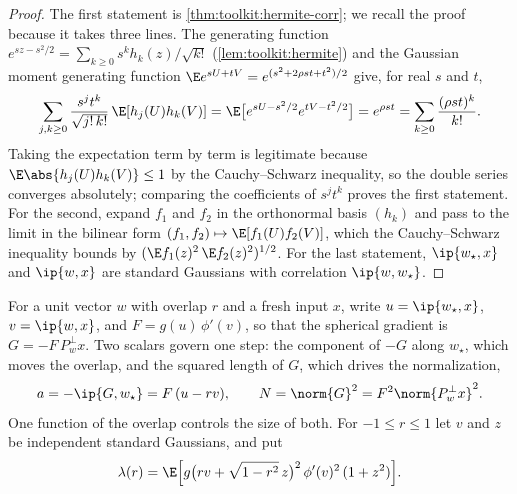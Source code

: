 \begin{refsection}
\begin{proof}
The first statement is \cref{thm:toolkit:hermite-corr}; we recall the proof because it takes three lines. The generating function $e^{sz-s^2/2}=\sum_{k\ge0}s^kh_k(z)/\sqrt{k!}$ (\cref{lem:toolkit:hermite}) and the Gaussian moment generating function $\E e^{sU+tV}=e^{(s^2+2\rho st+t^2)/2}$ give, for real $s$ and $t$,
\[
  \sum_{j,k\ge0}\frac{s^jt^k}{\sqrt{j!\,k!}}\,\E[h_j(U)h_k(V)]=\E\bigl[e^{sU-s^2/2}e^{tV-t^2/2}\bigr]=e^{\rho st}=\sum_{k\ge0}\frac{(\rho st)^k}{k!} .
\]
Taking the expectation term by term is legitimate because $\E\abs{h_j(U)h_k(V)}\le1$ by the Cauchy--Schwarz inequality, so the double series converges absolutely; comparing the coefficients of $s^jt^k$ proves the first statement. For the second, expand $f_1$ and $f_2$ in the orthonormal basis $(h_k)$ and pass to the limit in the bilinear form $(f_1,f_2)\mapsto\E[f_1(U)f_2(V)]$, which the Cauchy--Schwarz inequality bounds by $(\E f_1(z)^2\,\E f_2(z)^2)^{1/2}$. For the last statement, $\ip{w_\star,x}$ and $\ip{w,x}$ are standard Gaussians with correlation $\ip{w,w_\star}$.
\end{proof}

For a unit vector $w$ with overlap $r$ and a fresh input $x$, write $u=\ip{w_\star,x}$, $v=\ip{w,x}$, and $F=g(u)\,\phi'(v)$, so that the spherical gradient is $G=-F\,P_w^\perp x$. Two scalars govern one step: the component of $-G$ along $w_\star$, which moves the overlap, and the squared length of $G$, which drives the normalization,
\[
  a=-\ip{G,w_\star}=F\,(u-rv),\qquad N=\norm{G}^2=F^2\norm{P_w^\perp x}^2 .
\]
One function of the overlap controls the size of both. For $-1\le r\le1$ let $v$ and $z$ be independent standard Gaussians, and put
\begin{equation}\label{eq:singleindex:lambda}
  \lambda(r)=\E\Bigl[g\bigl(rv+\sqrt{1-r^2}\,z\bigr)^2\,\phi'(v)^2\,(1+z^2)\Bigr].
\end{equation}



\end{refsection}
